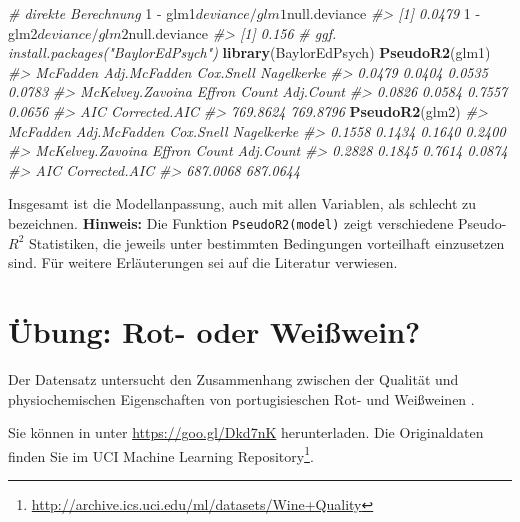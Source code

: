 \documentclass[12pt,ngerman,]{book}
\newenvironment{Shaded}{\begin{snugshade}}{\end{snugshade}}
\newcommand{\KeywordTok}[1]{\textcolor[rgb]{0.13,0.29,0.53}{\textbf{{#1}}}}
\newcommand{\DecValTok}[1]{\textcolor[rgb]{0.00,0.00,0.81}{{#1}}}
\newcommand{\StringTok}[1]{\textcolor[rgb]{0.31,0.60,0.02}{{#1}}}
\newcommand{\CommentTok}[1]{\textcolor[rgb]{0.56,0.35,0.01}{\textit{{#1}}}}
\newcommand{\NormalTok}[1]{{#1}}
\let\rmarkdownfootnote\footnote%
\def\footnote{\protect\rmarkdownfootnote}
\renewenvironment{Shaded}{\begin{kframe}}{\end{kframe}}
\begin{document}
\begin{Shaded}
\begin{Highlighting}[]
\CommentTok{# direkte Berechnung}
\DecValTok{1} \NormalTok{-}\StringTok{ }\NormalTok{glm1$deviance/glm1$null.deviance}
\CommentTok{#> [1] 0.0479}
\DecValTok{1} \NormalTok{-}\StringTok{ }\NormalTok{glm2$deviance/glm2$null.deviance}
\CommentTok{#> [1] 0.156}
\CommentTok{# ggf. install.packages("BaylorEdPsych")}
\KeywordTok{library}\NormalTok{(BaylorEdPsych)}
\KeywordTok{PseudoR2}\NormalTok{(glm1)}
\CommentTok{#>         McFadden     Adj.McFadden        Cox.Snell       Nagelkerke }
\CommentTok{#>           0.0479           0.0404           0.0535           0.0783 }
\CommentTok{#> McKelvey.Zavoina           Effron            Count        Adj.Count }
\CommentTok{#>           0.0826           0.0584           0.7557           0.0656 }
\CommentTok{#>              AIC    Corrected.AIC }
\CommentTok{#>         769.8624         769.8796}
\KeywordTok{PseudoR2}\NormalTok{(glm2)}
\CommentTok{#>         McFadden     Adj.McFadden        Cox.Snell       Nagelkerke }
\CommentTok{#>           0.1558           0.1434           0.1640           0.2400 }
\CommentTok{#> McKelvey.Zavoina           Effron            Count        Adj.Count }
\CommentTok{#>           0.2828           0.1845           0.7614           0.0874 }
\CommentTok{#>              AIC    Corrected.AIC }
\CommentTok{#>         687.0068         687.0644}
\end{Highlighting}
\end{Shaded}

Insgesamt ist die Modellanpassung, auch mit allen Variablen, als
schlecht zu bezeichnen. \textbf{Hinweis:} Die Funktion
\texttt{PseudoR2(model)} zeigt verschiedene Pseudo-\(R^2\) Statistiken,
die jeweils unter bestimmten Bedingungen vorteilhaft einzusetzen sind.
Für weitere Erläuterungen sei auf die Literatur verwiesen.

\section{Übung: Rot- oder Weißwein?}\label{ubung-rot--oder-weiwein}

Der Datensatz untersucht den Zusammenhang zwischen der Qualität und
physiochemischen Eigenschaften von portugisieschen Rot- und Weißweinen
\citep{cortez2009modeling}.

Sie können in unter \url{https://goo.gl/Dkd7nK} herunterladen. Die
Originaldaten finden Sie im UCI Machine Learning Repository\footnote{\url{http://archive.ics.uci.edu/ml/datasets/Wine+Quality}}.
\end{document}
